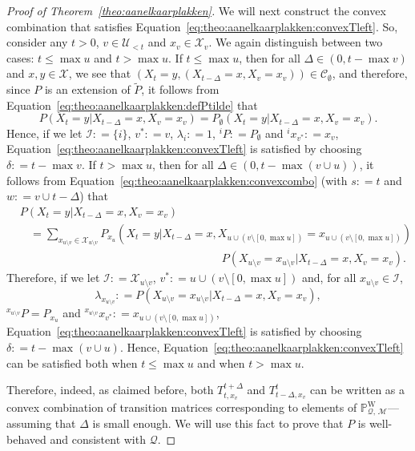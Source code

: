\documentclass[10pt,a4paper]{paper}
\theoremstyle{definition}
\newcommand{\states}{\mathcal{X}}
\newcommand{\processes}{\mathbb{P}}
\newcommand{\wprocesses}{\processes^{\mathrm{W}}}
\newcommand{\rateset}{\mathcal{Q}}
\newcommand{\coloneqq}{:\!=}
\begin{document}
\begin{proof}[Proof of Theorem~\ref{theo:aanelkaarplakken}]
We will next construct the convex combination that satisfies Equation~\eqref{eq:theo:aanelkaarplakken:convexTleft}. So, consider any $t>0$, $v\in\mathcal{U}_{<t}$ and $x_v\in\states_v$.
We again distinguish between two cases: $t\leq\max u$ and $t>\max u$. If $t\leq\max u$, then for all $\Delta\in(0,t-\max v)$ and $x,y\in\states$, we see that $(X_{t}=y,(X_{t-\Delta}=x, X_v=x_v))\in\mathcal{C}_\emptyset$, and therefore, since $P$ is an extension of $\tilde{P}$, it follows from Equation~\eqref{eq:theo:aanelkaarplakken:defPtilde} that
\begin{equation*}
P(X_{t}=y\vert X_{t-\Delta}=x, X_v=x_v)
=P_\emptyset(X_{t}=y\vert X_{t-\Delta}=x, X_v=x_v).
\end{equation*}
Hence, if we let $\mathcal{I}\coloneqq\{i\}$, $v^*\coloneqq v$, $\lambda_i\coloneqq 1$, ${}^iP\coloneqq P_\emptyset$ and ${}^ix_{v^*}\coloneqq x_v$, Equation~\eqref{eq:theo:aanelkaarplakken:convexTleft} is satisfied by choosing $\delta\coloneqq t-\max v$.
If $t>\max u$, then for all $\Delta\in(0,t-\max(v\cup u))$, it follows from Equation~\eqref{eq:theo:aanelkaarplakken:convexcombo} (with $s\coloneqq t$ and $w\coloneqq v\cup {t-\Delta}$) that
\begin{align*}
&P(X_{t}=y\vert X_{t-\Delta}=x, X_v=x_v)\\
&~~~~=
\sum_{x_{u\setminus v}\in\states_{u\setminus v}}
P_{x_u}(X_{t}=y\vert X_{t-\Delta}=x, 
X_{u\cup(v\setminus [0,\max u])}= 
x_{u\cup(v\setminus [0,\max u])})\\[-4mm]
&\quad\quad\quad\quad\quad\quad\quad\quad\quad\quad\quad\quad\quad\quad\quad\quad\quad\quad
P(X_{u\setminus v}=x_{u\setminus v}
\vert X_{t-\Delta}=x, X_v=x_v).
\end{align*}
Therefore, if we let $\mathcal{I}\coloneqq\states_{u\setminus v}$, $v^*\coloneqq u\cup(v\setminus [0,\max u])$ and, for all $x_{u\setminus v}\in \mathcal{I}$,
\begin{equation*}
\lambda_{x_{u\setminus v}}
\coloneqq P(X_{u\setminus v}=x_{u\setminus v}
\vert X_{t-\Delta}=x, X_v=x_v),
\end{equation*}
${}^{x_{u\setminus v}}P=P_{x_u}$ and ${}^{x_{u\setminus v}}x_{v^*}\coloneqq
x_{ u\cup(v\setminus [0,\max u])}$, Equation~\eqref{eq:theo:aanelkaarplakken:convexTleft} is satisfied by choosing $\delta\coloneqq t-\max(v\cup u)$.
Hence, Equation~\eqref{eq:theo:aanelkaarplakken:convexTleft} can be satisfied both when $t\leq \max u$ and when $t>\max u$.


Therefore, indeed, as claimed before, both $T_{t,x_v}^{t+\Delta}$ and $T_{t-\Delta,x_v}^t$ can be written as a convex combination of transition matrices corresponding to elements of $\wprocesses_{\rateset,\,\mathcal{M}}$---assuming that $\Delta$ is small enough.
We will use this fact to prove that $P$ is well-behaved and consistent with $\mathcal{Q}$.


\end{proof}
\end{document}
